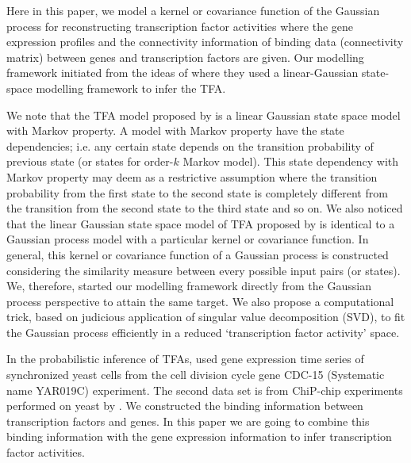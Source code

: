Here in this paper, we model a kernel or covariance function of the Gaussian process for reconstructing transcription factor activities where the gene expression profiles and the connectivity information of binding data (connectivity matrix) between genes and transcription factors are given. Our modelling framework initiated from the ideas of \cite{Sanguinetti:2006} where they used a linear-Gaussian state-space modelling framework to infer the TFA. 

We note that the TFA model proposed by \cite{Sanguinetti:2006} is a linear Gaussian state space model with Markov property. A model with Markov property have the state dependencies; i.e. any certain state depends on the transition probability of previous state (or states for order-$k$ Markov model).  This state dependency with Markov property may deem as a restrictive assumption where the transition probability from the first state to the second state is completely different from the transition from the second state to the third state and so on.  We also noticed that the linear Gaussian state space model of TFA proposed by \cite{Sanguinetti:2006} is identical to a Gaussian process model with a particular kernel or covariance function. In general, this kernel or covariance function of a Gaussian process is constructed considering the similarity measure between every possible input pairs (or states). We, therefore, started our modelling framework directly from the Gaussian process perspective to attain the same target. We also propose a computational trick, based on  judicious application of singular value decomposition (SVD), to fit the Gaussian process efficiently in a reduced \lq transcription factor activity\rq{ }space. 

In the probabilistic inference of TFAs, \cite{Spellman:1998} used gene expression time series of synchronized yeast cells from the cell division cycle gene CDC-15 (Systematic name YAR019C) experiment. 
The second data set is from ChiP-chip \cite{Ren:2000, Horak:2002} experiments performed on yeast by \cite{Lee:2002}. We constructed the binding information between transcription factors and genes. In this paper we are going to combine this binding information with the gene expression information to infer transcription factor activities.

